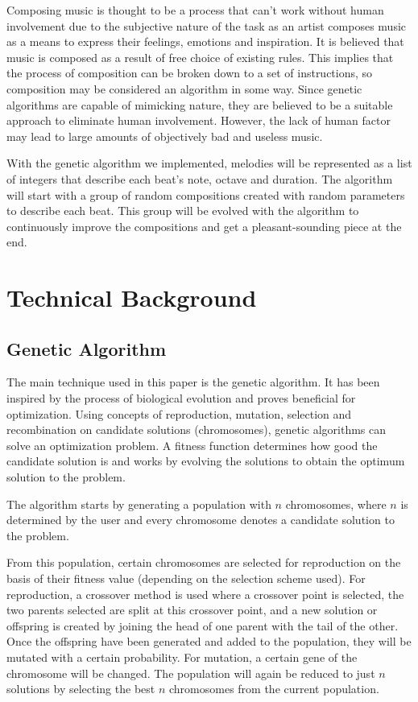 \documentclass[conference]{IEEEtran}
\begin{document}
Composing music is thought to be a process that can't work without human involvement due to the subjective nature of the task as an artist composes music as a means to express their feelings, emotions and inspiration. It is believed that music is composed as a result of free choice of existing rules. This implies that the process of composition can be broken down to a set of instructions, so composition may be considered an algorithm in some way. Since genetic algorithms are capable of mimicking  nature, they are believed to be a suitable approach to eliminate human involvement. However, the lack of human factor may lead to large amounts of objectively bad and useless music.

With the genetic algorithm we implemented, melodies will be represented as a list of integers that describe each beat's note, octave and duration. The algorithm will start with a group of random compositions created with random parameters to describe each beat. This group will be evolved with the algorithm to continuously improve the compositions and get a pleasant-sounding piece at the end.

\section{Technical Background}
\subsection{Genetic Algorithm}
The main technique used in this paper is the genetic algorithm. It has been inspired by the process of biological evolution and proves beneficial for optimization. Using concepts of reproduction, mutation, selection and recombination on candidate solutions (chromosomes), genetic algorithms can solve an optimization problem. A fitness function determines how good the candidate solution is and works by evolving the solutions to obtain the optimum solution to the problem.

The algorithm starts by generating a population with $n$ chromosomes, where $n$ is determined by the user and every chromosome denotes a candidate solution to the problem.

From this population, certain chromosomes are selected for reproduction on the basis of their fitness value (depending on the selection scheme used). For reproduction, a crossover method is used where a crossover point is selected, the two parents selected are split at this crossover point, and a new solution or offspring is created by joining the head of one parent with the tail of the other. Once the offspring have been generated and added to the population, they will be mutated with a certain probability. For mutation, a certain gene of the chromosome will be changed. The population will again be reduced to just $n$ solutions by selecting the best $n$ chromosomes from the current population.
\end{document}
